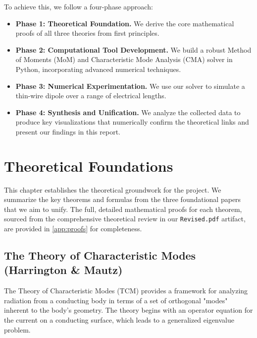 \documentclass[11pt, a4paper]{report}
\begin{document}
To achieve this, we follow a four-phase approach:
\begin{itemize}
    \item \textbf{Phase 1: Theoretical Foundation.} We derive the core mathematical proofs of all three theories from first principles.
    \item \textbf{Phase 2: Computational Tool Development.} We build a robust Method of Moments (MoM) and Characteristic Mode Analysis (CMA) solver in Python, incorporating advanced numerical techniques.
    \item \textbf{Phase 3: Numerical Experimentation.} We use our solver to simulate a thin-wire dipole over a range of electrical lengths.
    \item \textbf{Phase 4: Synthesis and Unification.} We analyze the collected data to produce key visualizations that numerically confirm the theoretical links and present our findings in this report.
\end{itemize}

\newpage

\chapter{Theoretical Foundations} \label{ch:theory}

This chapter establishes the theoretical groundwork for the project. We summarize the key theorems and formulas from the three foundational papers that we aim to unify. The full, detailed mathematical proofs for each theorem, sourced from the comprehensive theoretical review in our \texttt{Revised.pdf} artifact, are provided in \cref{app:proofs} for completeness.

\section{The Theory of Characteristic Modes (Harrington \& Mautz)}
The Theory of Characteristic Modes (TCM) provides a framework for analyzing radiation from a conducting body in terms of a set of orthogonal "modes" inherent to the body's geometry. The theory begins with an operator equation for the current on a conducting surface, which leads to a generalized eigenvalue problem.
\end{document}
